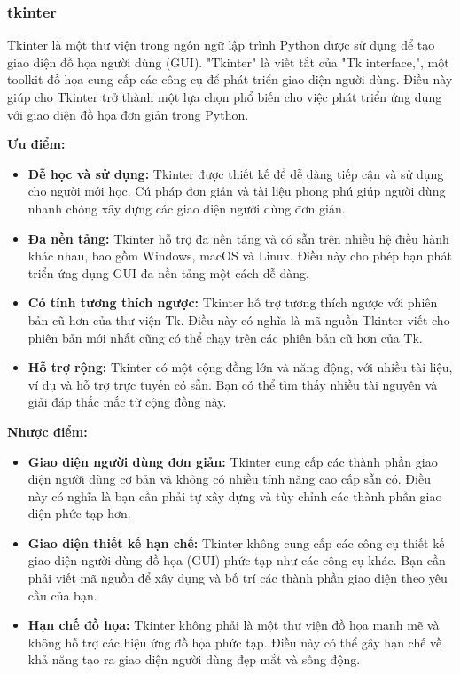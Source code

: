 \documentclass[a4paper]{article}
\begin{document}
\subsubsection{tkinter}
\begin{par}
    Tkinter là một thư viện trong ngôn ngữ lập trình Python được sử dụng để tạo giao diện đồ họa người dùng (GUI). "Tkinter" là viết tắt của "Tk interface,", một toolkit đồ họa cung cấp các công cụ để phát triển giao diện người dùng. Điều này giúp cho Tkinter trở thành một lựa chọn phổ biến cho việc phát triển ứng dụng với giao diện đồ họa đơn giản trong Python.
\end{par}

\begin{par}

\textbf{Ưu điểm:}
    \begin{itemize}
    \item \textbf{Dễ học và sử dụng:} Tkinter được thiết kế để dễ dàng tiếp cận và sử dụng cho người mới học. Cú pháp đơn giản và tài liệu phong phú giúp người dùng nhanh chóng xây dựng các giao diện người dùng đơn giản.
    \item \textbf{Đa nền tảng:} Tkinter hỗ trợ đa nền tảng và có sẵn trên nhiều hệ điều hành khác nhau, bao gồm Windows, macOS và Linux. Điều này cho phép bạn phát triển ứng dụng GUI đa nền tảng một cách dễ dàng.
    \item \textbf{Có tính tương thích ngược:} Tkinter hỗ trợ tương thích ngược với phiên bản cũ hơn của thư viện Tk. Điều này có nghĩa là mã nguồn Tkinter viết cho phiên bản mới nhất cũng có thể chạy trên các phiên bản cũ hơn của Tk.
    \item \textbf{Hỗ trợ rộng:} Tkinter có một cộng đồng lớn và năng động, với nhiều tài liệu, ví dụ và hỗ trợ trực tuyến có sẵn. Bạn có thể tìm thấy nhiều tài nguyên và giải đáp thắc mắc từ cộng đồng này.
\end{itemize}

\textbf{Nhược điểm:}
\begin{itemize}
    \item \textbf{Giao diện người dùng đơn giản:} Tkinter cung cấp các thành phần giao diện người dùng cơ bản và không có nhiều tính năng cao cấp sẵn có. Điều này có nghĩa là bạn cần phải tự xây dựng và tùy chỉnh các thành phần giao diện phức tạp hơn.
    \item \textbf{Giao diện thiết kế hạn chế:} Tkinter không cung cấp các công cụ thiết kế giao diện người dùng đồ họa (GUI) phức tạp như các công cụ khác. Bạn cần phải viết mã nguồn để xây dựng và bố trí các thành phần giao diện theo yêu cầu của bạn.
    \item \textbf{Hạn chế đồ họa:} Tkinter không phải là một thư viện đồ họa mạnh mẽ và không hỗ trợ các hiệu ứng đồ họa phức tạp. Điều này có thể gây hạn chế về khả năng tạo ra giao diện người dùng đẹp mắt và sống động.
\end{itemize}
\end{par}
\end{document}
